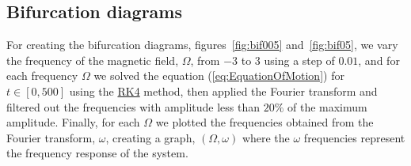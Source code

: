 \subsection{Bifurcation diagrams}

For creating the bifurcation diagrams, figures~\ref{fig:bif005} and~\ref{fig:bif05}, we vary the frequency of the magnetic field, $\Omega$, from $-3$ to $3$ using a step of $0.01$, and for each frequency $\Omega$ we solved the equation (\ref{eq:EquationOfMotion}) for $t \in [0,500]$ using the \hyperref[sec:RK4]{RK4} method, then applied the Fourier transform and filtered out the frequencies with amplitude less than $20\%$ of the maximum amplitude. Finally, for each $\Omega$ we plotted the frequencies obtained from the Fourier transform, $\omega$, creating a graph, $(\Omega,\omega)$ where the $\omega$ frequencies represent the frequency response of the system.  

